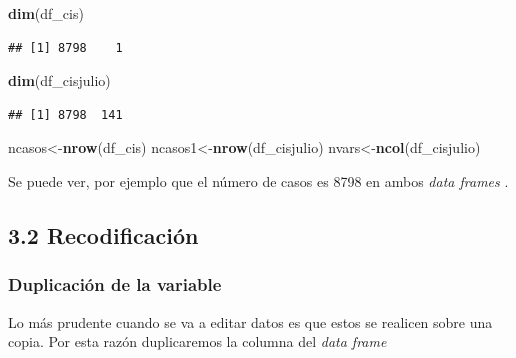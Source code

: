 \documentclass[
]{article}
\newenvironment{Shaded}{\begin{snugshade}}{\end{snugshade}}
\newcommand{\FunctionTok}[1]{\textcolor[rgb]{0.13,0.29,0.53}{\textbf{#1}}}
\newcommand{\NormalTok}[1]{#1}
\newcommand{\OtherTok}[1]{\textcolor[rgb]{0.56,0.35,0.01}{#1}}
\newcommand{\SpecialCharTok}[1]{\textcolor[rgb]{0.81,0.36,0.00}{\textbf{#1}}}
\begin{document}
\begin{Shaded}
\begin{Highlighting}[]
\FunctionTok{dim}\NormalTok{(df\_cis)}
\end{Highlighting}
\end{Shaded}

\begin{verbatim}
## [1] 8798    1
\end{verbatim}

\begin{Shaded}
\begin{Highlighting}[]
\FunctionTok{dim}\NormalTok{(df\_cisjulio)}
\end{Highlighting}
\end{Shaded}

\begin{verbatim}
## [1] 8798  141
\end{verbatim}

\begin{Shaded}
\begin{Highlighting}[]
\NormalTok{ncasos}\OtherTok{\textless{}{-}}\FunctionTok{nrow}\NormalTok{(df\_cis)}
\NormalTok{ncasos1}\OtherTok{\textless{}{-}}\FunctionTok{nrow}\NormalTok{(df\_cisjulio)}
\NormalTok{nvars}\OtherTok{\textless{}{-}}\FunctionTok{ncol}\NormalTok{(df\_cisjulio)}
\end{Highlighting}
\end{Shaded}

Se puede ver, por ejemplo que el número de casos es 8798 en ambos
\emph{data frames} .

\hypertarget{recodificaciuxf3n}{%
\subsection{3.2 Recodificación}\label{recodificaciuxf3n}}

\hypertarget{duplicaciuxf3n-de-la-variable}{%
\subsubsection{Duplicación de la
variable}\label{duplicaciuxf3n-de-la-variable}}

Lo más prudente cuando se va a editar datos es que estos se realicen
sobre una copia. Por esta razón duplicaremos la columna del \emph{data
frame}

\begin{Shaded}
\end{Shaded}
\end{document}
